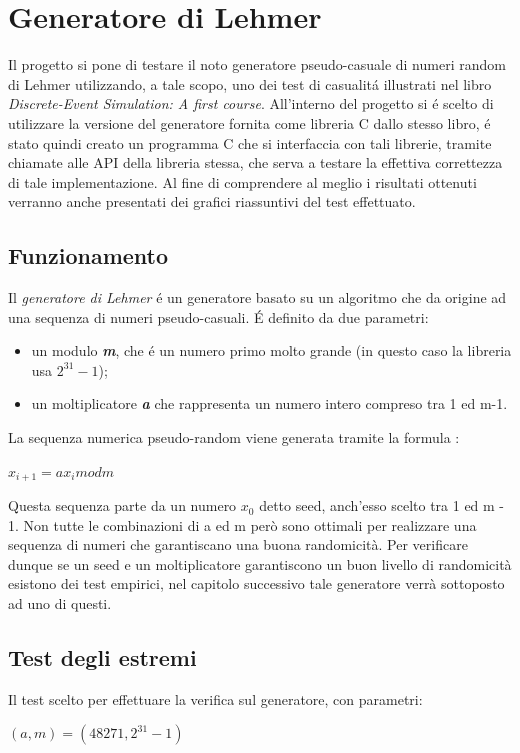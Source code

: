 \chapter{Generatore di Lehmer}
	\label{cap:generatorerandom}

Il progetto si pone di testare il noto generatore pseudo-casuale di numeri 
random di Lehmer utilizzando, a tale scopo, uno dei test di casualit\'a 
illustrati nel libro \textit{Discrete-Event Simulation: A first course}.
All'interno del progetto si \'e scelto di utilizzare la versione del generatore
fornita come libreria C dallo stesso libro, \'e stato quindi creato un programma C
che si interfaccia con tali librerie, tramite chiamate alle API della libreria 
stessa,
che serva a testare la effettiva correttezza di tale implementazione.
Al fine di comprendere al meglio i risultati ottenuti verranno anche
presentati dei grafici riassuntivi del test effettuato.

\section{Funzionamento}
Il \textit{generatore di Lehmer} \'e un generatore basato su un algoritmo che da 
origine ad una sequenza di numeri pseudo-casuali. \'E definito da due parametri:

\begin{itemize}
 \item un modulo \textbf{\textit{m}}, che \'e un numero primo molto grande (in 
questo caso la libreria usa $2^{31} - 1$);
 \item un moltiplicatore \textbf{\textit{a}} che rappresenta un numero intero 
compreso tra 1 ed m-1.
\end{itemize}

\noindent La sequenza numerica pseudo-random viene generata tramite la formula :

\begin{center} $x_{i+1} = ax_{i} mod m$ \end{center}

\noindent Questa sequenza parte da un numero $x_{0}$ detto seed, anch'esso 
scelto tra 1 ed m - 1. Non tutte le combinazioni di a ed m però sono ottimali 
per realizzare una sequenza di numeri che garantiscano una buona randomicit\`a. 
Per verificare dunque se un seed e un moltiplicatore garantiscono un buon 
livello di 
randomicit\`a esistono dei test empirici, nel capitolo successivo tale generatore 
verr\`a sottoposto ad uno di questi.

\section{Test degli estremi}
Il test scelto per effettuare la verifica sul generatore, con parametri:
\begin{center}
$(a,m) = (48271, 2^{31} - 1)$
\end{center}

